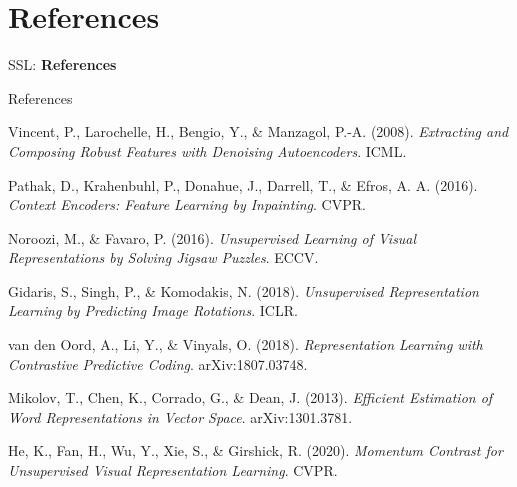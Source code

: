 \section{References}
\begin{frame}{}
    \LARGE SSL: \textbf{References}
\end{frame}

\begin{frame}[allowframebreaks]{References}
\begin{thebibliography}{9}

Vincent, P., Larochelle, H., Bengio, Y., \& Manzagol, P.-A. (2008). \textit{Extracting and Composing Robust Features with Denoising Autoencoders}. ICML.

Pathak, D., Krahenbuhl, P., Donahue, J., Darrell, T., \& Efros, A. A. (2016). \textit{Context Encoders: Feature Learning by Inpainting}. CVPR.

Noroozi, M., \& Favaro, P. (2016). \textit{Unsupervised Learning of Visual Representations by Solving Jigsaw Puzzles}. ECCV.

Gidaris, S., Singh, P., \& Komodakis, N. (2018). \textit{Unsupervised Representation Learning by Predicting Image Rotations}. ICLR.

van den Oord, A., Li, Y., \& Vinyals, O. (2018). \textit{Representation Learning with Contrastive Predictive Coding}. arXiv:1807.03748.

Mikolov, T., Chen, K., Corrado, G., \& Dean, J. (2013). \textit{Efficient Estimation of Word Representations in Vector Space}. arXiv:1301.3781.

He, K., Fan, H., Wu, Y., Xie, S., \& Girshick, R. (2020). \textit{Momentum Contrast for Unsupervised Visual Representation Learning}. CVPR.

\end{thebibliography}
\end{frame}